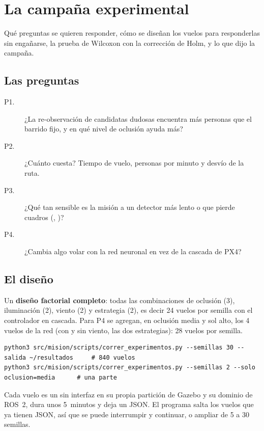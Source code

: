 \chapter{La campaña experimental}
\label{cap:experimental}

\begin{enpocas}
Qué preguntas se quieren responder, cómo se diseñan los vuelos para responderlas sin engañarse, la
prueba de Wilcoxon con la corrección de Holm, y lo que dijo la campaña.
\end{enpocas}

\section{Las preguntas}

\begin{description}
  \item[P1.] ¿La re-observación de candidatas dudosas encuentra más personas que el barrido fijo, y
        en qué nivel de oclusión ayuda más?
  \item[P2.] ¿Cuánto cuesta? Tiempo de vuelo, personas por minuto y desvío de la ruta.
  \item[P3.] ¿Qué tan sensible es la misión a un detector más lento o que pierde cuadros
        (, )?
  \item[P4.] ¿Cambia algo volar con la red neuronal en vez de la cascada de PX4?
\end{description}

\section{El diseño}

Un \textbf{diseño factorial completo}: todas las combinaciones de oclusión (3), iluminación (2), viento
(2) y estrategia (2), es decir 24 vuelos por semilla con el controlador en cascada. Para P4 se agregan,
en oclusión media y sol alto, los 4 vuelos de la red (con y sin viento, las dos estrategias): 28 vuelos
por semilla.

\begin{lstlisting}[style=bash]
python3 src/mision/scripts/correr_experimentos.py --semillas 30 --salida ~/resultados     # 840 vuelos
python3 src/mision/scripts/correr_experimentos.py --semillas 2 --solo oclusion=media      # una parte
\end{lstlisting}

Cada vuelo es un  sin interfaz en su propia partición de Gazebo y su dominio de ROS~2,
dura unos 5~minutos y deja un JSON. El programa salta los vuelos que ya tienen JSON, así que se puede
interrumpir y continuar, o ampliar de 5 a 30 semillas.

